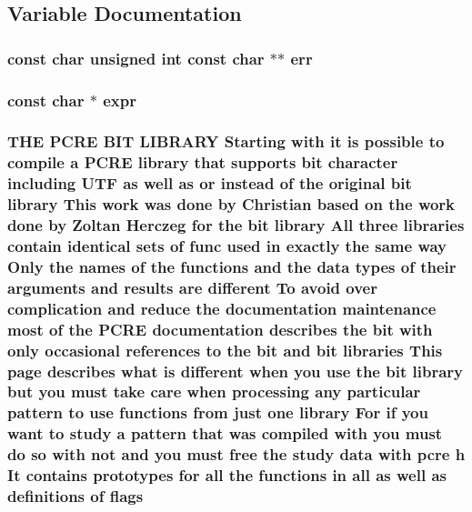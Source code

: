 \subsection{Variable Documentation}
\subsubsection[{\texorpdfstring{err}{err}}]{\setlength{\rightskip}{0pt plus 5cm}const char unsigned {\bf int} const char $\ast$$\ast$ err}\hypertarget{group__AP__EXPR_gaccebe6c638c552d2845014cf8bdea8d8}{}\label{group__AP__EXPR_gaccebe6c638c552d2845014cf8bdea8d8}
\subsubsection[{\texorpdfstring{expr}{expr}}]{\setlength{\rightskip}{0pt plus 5cm}const char $\ast$ expr}\hypertarget{group__AP__EXPR_ga678330dc2f7e5114b38824a310f676ed}{}\label{group__AP__EXPR_ga678330dc2f7e5114b38824a310f676ed}
\subsubsection[{\texorpdfstring{flags}{flags}}]{\setlength{\rightskip}{0pt plus 5cm}T\+HE {\bf P\+C\+RE} {\bf B\+IT} L\+I\+B\+R\+A\+RY Starting {\bf with} {\bf it} {\bf is} {\bf possible} {\bf to} {\bf compile} {\bf a} {\bf P\+C\+RE} {\bf library} that supports {\bf bit} {\bf character} including U\+TF {\bf as} well {\bf as} {\bf or} instead {\bf of} the original {\bf bit} {\bf library} This work was {\bf done} by Christian based {\bf on} the work {\bf done} by Zoltan Herczeg for the {\bf bit} {\bf library} All three {\bf libraries} contain {\bf identical} sets {\bf of} {\bf func} {\bf used} {\bf in} {\bf exactly} the same {\bf way} Only the {\bf names} {\bf of} the {\bf functions} and the {\bf data} {\bf types} {\bf of} their {\bf arguments} and {\bf results} {\bf are} different To avoid over {\bf complication} and reduce the {\bf documentation} {\bf maintenance} most {\bf of} the {\bf P\+C\+RE} {\bf documentation} describes the {\bf bit} {\bf with} only occasional references {\bf to} the {\bf bit} and {\bf bit} {\bf libraries} This page describes {\bf what} {\bf is} different when you use the {\bf bit} {\bf library} but you must take care when processing {\bf any} {\bf particular} {\bf pattern} {\bf to} use {\bf functions} {\bf from} just one {\bf library} For {\bf if} you want {\bf to} {\bf study} {\bf a} {\bf pattern} that was {\bf compiled} {\bf with} you must {\bf do} {\bf so} {\bf with} {\bf not} and you must {\bf free} the {\bf study} {\bf data} {\bf with} {\bf pcre} {\bf h} It {\bf contains} prototypes for {\bf all} the {\bf functions} {\bf in} {\bf all} {\bf as} well {\bf as} definitions {\bf of} flags}\hypertarget{group__AP__EXPR_gad7a10cd81a384ff727296d05bb827806}{}\label{group__AP__EXPR_gad7a10cd81a384ff727296d05bb827806}
